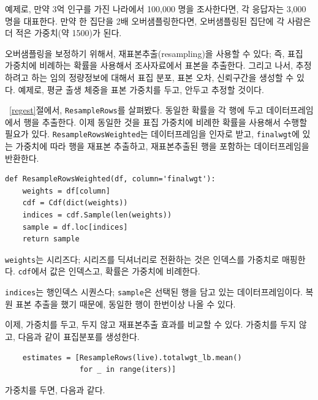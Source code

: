 예제로, 만약 3억 인구를 가진 나라에서 100,000 명을 조사한다면, 각 응답자는 3,000 명을 대표한다. 만약 한 집단을 2배 오버샘플링한다면, 오버샘플링된 집단에 각 사람은 더 적은 가중치(약 1500)가 된다.

오버샘플링을 보정하기 위해서, 재표본추출(resampling)을 사용할 수 있다; 즉, 표집 가중치에 비례하는 확률을 사용해서 조사자료에서 표본을 추출한다.
그리고 나서, 추정하려고 하는 임의 정량정보에 대해서 표집 분포, 표본 오차, 신뢰구간을 생성할 수 있다. 예제로, 평균 출생 체중을 표본 가중치를 두고, 안두고 추정할 것이다.


~\ref{regest}절에서, {\tt ResampleRows}를 살펴봤다. 동일한 확률을 각 행에 두고 데이터프레임에서 행을 추출한다. 이제 동일한 것을 표집 가중치에 비례한 확률을 사용해서 수행할 필요가 있다. {\tt ResampleRowsWeighted}는 데이터프레임을 인자로 받고, {\tt finalwgt}에 있는 가중치에 따라 행을 재표본 추출하고, 재표본추출된 행을 포함하는 데이터프레임을 반환한다.


\begin{verbatim}
def ResampleRowsWeighted(df, column='finalwgt'):
    weights = df[column]
    cdf = Cdf(dict(weights))
    indices = cdf.Sample(len(weights))
    sample = df.loc[indices]
    return sample
\end{verbatim}

{\tt weights}는 시리즈다; 시리즈를 딕셔너리로 전환하는 것은 인덱스를 가중치로 매핑한다. {\tt cdf}에서 값은 인덱스고, 확률은 가중치에 비례한다.

{\tt indices}는 행인덱스 시퀀스다; {\tt sample}은 선택된 행을 담고 있는 데이터프레임이다. 복원 표본 추출을 했기 때문에, 동일한 행이 한번이상 나올 수 있다.

이제, 가중치를 두고, 두지 않고 재표본추출 효과를 비교할 수 있다.
가중치를 두지 않고, 다음과 같이 표집분포를 생성한다.

\begin{verbatim}
    estimates = [ResampleRows(live).totalwgt_lb.mean()
                 for _ in range(iters)]
\end{verbatim}

가중치를 두면, 다음과 같다.

